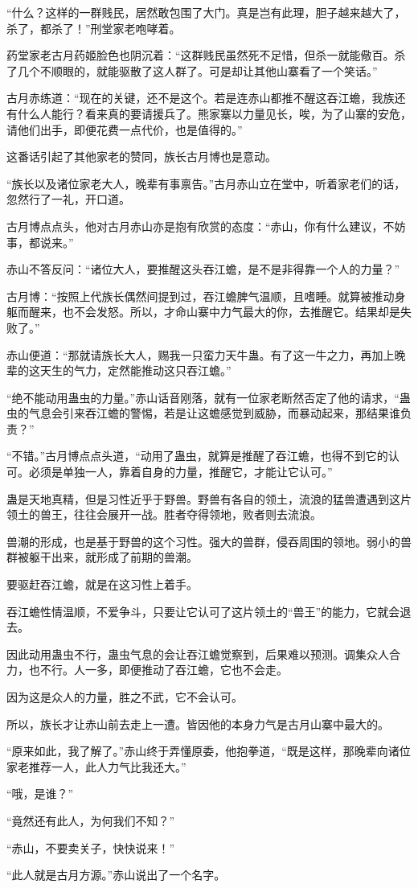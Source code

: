 \begin{this_body}
“什么？这样的一群贱民，居然敢包围了大门。真是岂有此理，胆子越来越大了，杀了，都杀了！”刑堂家老咆哮着。

药堂家老古月药姬脸色也阴沉着：“这群贱民虽然死不足惜，但杀一就能儆百。杀了几个不顺眼的，就能驱散了这人群了。可是却让其他山寨看了一个笑话。”

古月赤练道：“现在的关键，还不是这个。若是连赤山都推不醒这吞江蟾，我族还有什么人能行？看来真的要请援兵了。熊家寨以力量见长，唉，为了山寨的安危，请他们出手，即便花费一点代价，也是值得的。”

这番话引起了其他家老的赞同，族长古月博也是意动。

“族长以及诸位家老大人，晚辈有事禀告。”古月赤山立在堂中，听着家老们的话，忽然行了一礼，开口道。

古月博点点头，他对古月赤山亦是抱有欣赏的态度：“赤山，你有什么建议，不妨事，都说来。”

赤山不答反问：“诸位大人，要推醒这头吞江蟾，是不是非得靠一个人的力量？”

古月博：“按照上代族长偶然间提到过，吞江蟾脾气温顺，且嗜睡。就算被推动身躯而醒来，也不会发怒。所以，才命山寨中力气最大的你，去推醒它。结果却是失败了。”

赤山便道：“那就请族长大人，赐我一只蛮力天牛蛊。有了这一牛之力，再加上晚辈的这天生的气力，定然能推动这只吞江蟾。”

“绝不能动用蛊虫的力量。”赤山话音刚落，就有一位家老断然否定了他的请求，“蛊虫的气息会引来吞江蟾的警惕，若是让这蟾感觉到威胁，而暴动起来，那结果谁负责？”

“不错。”古月博点点头道，“动用了蛊虫，就算是推醒了吞江蟾，也得不到它的认可。必须是单独一人，靠着自身的力量，推醒它，才能让它认可。”

蛊是天地真精，但是习性近乎于野兽。野兽有各自的领土，流浪的猛兽遭遇到这片领土的兽王，往往会展开一战。胜者夺得领地，败者则去流浪。

兽潮的形成，也是基于野兽的这个习性。强大的兽群，侵吞周围的领地。弱小的兽群被躯干出来，就形成了前期的兽潮。

要驱赶吞江蟾，就是在这习性上着手。

吞江蟾性情温顺，不爱争斗，只要让它认可了这片领土的“兽王”的能力，它就会退去。

因此动用蛊虫不行，蛊虫气息的会让吞江蟾觉察到，后果难以预测。调集众人合力，也不行。人一多，即便推动了吞江蟾，它也不会走。

因为这是众人的力量，胜之不武，它不会认可。

所以，族长才让赤山前去走上一遭。皆因他的本身力气是古月山寨中最大的。

“原来如此，我了解了。”赤山终于弄懂原委，他抱拳道，“既是这样，那晚辈向诸位家老推荐一人，此人力气比我还大。”

“哦，是谁？”

“竟然还有此人，为何我们不知？”

“赤山，不要卖关子，快快说来！”

“此人就是古月方源。”赤山说出了一个名字。

\end{this_body}

